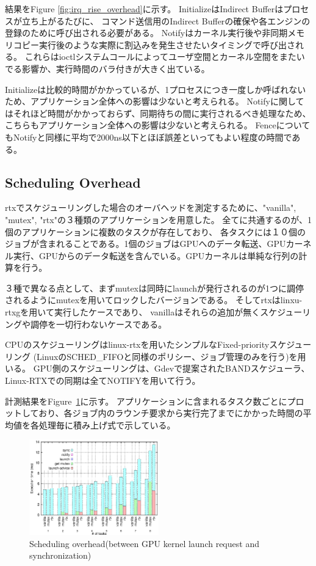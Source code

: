 結果をFigure \ref{fig:irq_rise_overhead}に示す。
InitializeはIndirect Bufferはプロセスが立ち上がるたびに、
コマンド送信用のIndirect Bufferの確保や各エンジンの登録のために呼び出される必要がある。
Notifyはカーネル実行後や非同期メモリコピー実行後のような実際に割込みを発生させたいタイミングで呼び出される。
これらはioctlシステムコールによってユーザ空間とカーネル空間をまたいでる影響か、実行時間のバラ付きが大きく出ている。

Initializeは比較的時間がかかっているが、1プロセスにつき一度しか呼ばれないため、アプリケーション全体への影響は少ないと考えられる。
Notifyに関してはそれほど時間がかかっておらず、同期待ちの間に実行されるべき処理なため、こちらもアプリケーション全体への影響は少ないと考えられる。
FenceについてもNotifyと同様に平均で2000ns以下とほぼ誤差といってもよい程度の時間である。

\subsection{Scheduling Overhead}\label{sec:eval:sched_overhead}

rtxでスケジューリングした場合のオーバヘッドを測定するために、"vanilla", "mutex", "rtx"の３種類のアプリケーションを用意した。
全てに共通するのが、1個のアプリケーションに複数のタスクが存在しており、
各タスクには１０個のジョブが含まれることである。1個のジョブはGPUへのデータ転送、GPUカーネル実行、GPUからのデータ転送を含んでいる。GPUカーネルは単純な行列の計算を行う。

３種で異なる点として、まずmutexは同時にlaunchが発行されるのが1つに調停されるようにmutexを用いてロックしたバージョンである。
そしてrtxはlinxu-rtxgを用いて実行したケースであり、
vanillaはそれらの追加が無くスケジューリングや調停を一切行わないケースである。

CPUのスケジューリングはlinux-rtxを用いたシンプルなFixed-priorityスケジューリング (LinuxのSCHED\_FIFOと同様のポリシー、ジョブ管理のみを行う)を用いる。
GPU側のスケジューリングは、Gdevで提案されたBANDスケジューラ、Linux-RTXでの同期は全てNOTIFYを用いて行う。

計測結果をFigure~\ref{fig:fp_overhead}に示す。
アプリケーションに含まれるタスク数ごとにプロットしており、各ジョブ内のラウンチ要求から実行完了までにかかった時間の平均値を各処理毎に積み上げ式で示している。


\begin{figure}[t]
\begin{center}
\includegraphics[width=0.5\textwidth]{img/sum_task_fp.eps}
\caption{Scheduling overhead(between GPU kernel launch request and synchronization)}
\end{center}
\label{fig:fp_overhead}
\end{figure}

